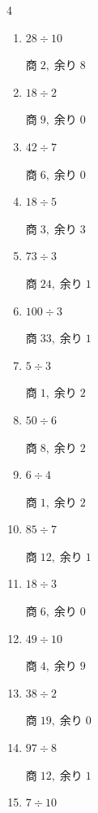 \begin{multicols}{4}
\begin{enumerate}
        $商\; 3,\; 余り\; 1$

  \item $28 \div 10$

        $商\; 2,\; 余り\; 8$

  \item $18 \div 2$

        $商\; 9,\; 余り\; 0$

  \item $42 \div 7$

        $商\; 6,\; 余り\; 0$

  \item $18 \div 5$

        $商\; 3,\; 余り\; 3$

  \item $73 \div 3$

        $商\; 24,\; 余り\; 1$

  \item $100 \div 3$

        $商\; 33,\; 余り\; 1$

  \item $5 \div 3$

        $商\; 1,\; 余り\; 2$

  \item $50 \div 6$

        $商\; 8,\; 余り\; 2$

  \item $6 \div 4$

        $商\; 1,\; 余り\; 2$

  \item $85 \div 7$

        $商\; 12,\; 余り\; 1$

  \item $18 \div 3$

        $商\; 6,\; 余り\; 0$

  \item $49 \div 10$

        $商\; 4,\; 余り\; 9$

\columnbreak %

\resetques

  \item $38 \div 2$

        $商\; 19,\; 余り\; 0$

  \item $97 \div 8$

        $商\; 12,\; 余り\; 1$

  \item $7 \div 10$


\end{enumerate}
\end{multicols}
